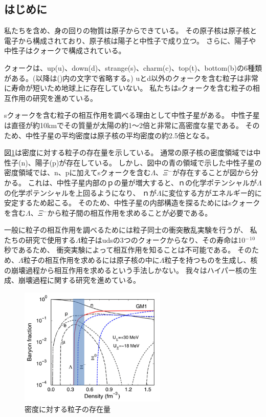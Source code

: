 \documentclass[12pt,a4paper]{jarticle}
\begin{document}
\subsection{はじめに}
私たちを含め、身の回りの物質は原子からできている。
その原子核は原子核と電子から構成されており、原子核は陽子と中性子で成り立つ。
さらに、陽子や中性子はクォークで構成されている。
\par
クォークは、up(u)、down(d)、strange(s)、charm(c)、top(t)、bottom(b)の6種類がある。(以降は()内の文字で省略する。)
uとd以外のクォークを含む粒子は非常に寿命が短いため地球上に存在していない。
私たちはsクォークを含む粒子の相互作用の研究を進めている。
\par
sクォークを含む粒子の相互作用を調べる理由として中性子星がある。
中性子星は直径が約10kmでその質量が太陽の約1～2倍と非常に高密度な星である。
そのため、中性子星の平均密度は原子核の平均密度の約2.5倍となる。
\par
図\ref{fig:den_barion}は密度に対する粒子の存在量を示している。
通常の原子核の密度領域では中性子(n)、陽子(p)が存在している。
しかし、図中の青の領域で示した中性子星の密度領域では、n、pに加えてsクォークを含む$\Lambda$、$\Xi$$^-$が存在することが図から分かる。
これは、中性子星内部のｐの量が増大すると、ｎの化学ポテンシャルが$\Lambda$の化学ポテンシャルを上回るようになり、
ｎが$\Lambda$に変位する方がエネルギー的に安定するため起こる。
そのため、中性子星の内部構造を探るためにはsクォークを含む$\Lambda$、$\Xi$$^-$から粒子間の相互作用を求めることが必要である。
\par
一般に粒子の相互作用を調べるためには粒子同士の衝突散乱実験を行うが、
私たちの研究で使用する$\Lambda$粒子はudsの3つのクォークからなり、その寿命は10$^-$$^1$$^0$秒であるため、
衝突実験によって相互作用を知ることは不可能である。
そのため、$\Lambda$粒子の相互作用を求めるには原子核の中に$\Lambda$粒子を持つものを生成し、核の崩壊過程から相互作用を求めるという手法しかない。
我々はハイパー核の生成、崩壊過程に関する研究を進めている。
\begin{figure}[htbp]
  \centering
   \includegraphics[width=70mm]{den_barion.png}
  \caption{密度に対する粒子の存在量\label{fig:den_barion}}
\end{figure}
\end{document}
